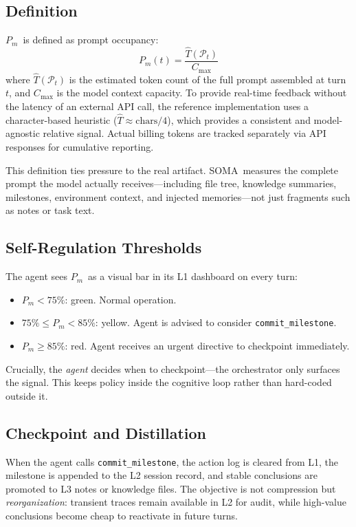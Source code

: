 \documentclass[11pt,a4paper]{article}
\newcommand{\soma}{\textsc{SOMA}}
\newcommand{\Pm}{\ensuremath{P_m}}
\begin{document}
\subsection{Definition}

\Pm\ is defined as prompt occupancy:
\begin{equation}
  \Pm(t) = \frac{\hat{T}(\mathcal{P}_t)}{C_{\max}}
\end{equation}
where $\hat{T}(\mathcal{P}_t)$ is the estimated token count of the full
prompt assembled at turn $t$, and $C_{\max}$ is the model context capacity.
To provide real-time feedback without the latency of an external API call,
the reference implementation uses a character-based heuristic
($\hat{T} \approx \text{chars}/4$), which provides a consistent and
model-agnostic relative signal.
Actual billing tokens are tracked separately via API responses for
cumulative reporting.

This definition ties pressure to the real artifact.
\soma\ measures the complete prompt the model actually receives---including
file tree, knowledge summaries, milestones, environment context, and injected
memories---not just fragments such as notes or task text.

\subsection{Self-Regulation Thresholds}

The agent sees \Pm\ as a visual bar in its L1 dashboard on every turn:
\begin{itemize}[leftmargin=*]
  \item $\Pm < 75\%$: green. Normal operation.
  \item $75\% \leq \Pm < 85\%$: yellow. Agent is advised to consider
        \texttt{commit\_milestone}.
  \item $\Pm \geq 85\%$: red. Agent receives an urgent directive to
        checkpoint immediately.
\end{itemize}

Crucially, the \emph{agent} decides when to checkpoint---the orchestrator
only surfaces the signal.
This keeps policy inside the cognitive loop rather than hard-coded outside it.

\subsection{Checkpoint and Distillation}

When the agent calls \texttt{commit\_milestone}, the action log is cleared
from L1, the milestone is appended to the L2 session record, and stable
conclusions are promoted to L3 notes or knowledge files.
The objective is not compression but \emph{reorganization}: transient traces
remain available in L2 for audit, while high-value conclusions become cheap
to reactivate in future turns.
\end{document}
